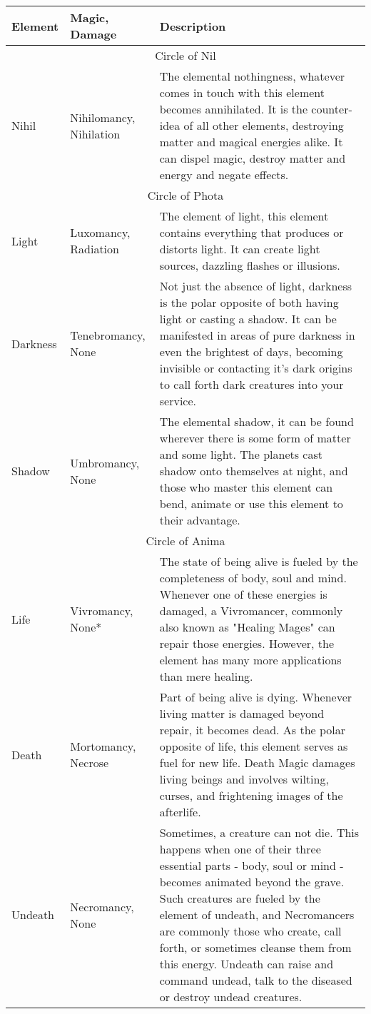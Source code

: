 \begin{longtable}{l | p{2.5cm} | p{7.25cm}}
	Element & Magic, Damage & Description\\ \hline
	\multicolumn{3}{c}{Circle of Nil}\\ \hline
	Nihil & Nihilomancy, Nihilation & 	The elemental nothingness, whatever comes in touch with this element becomes annihilated. It is the counter-idea of all other elements, destroying matter and magical energies alike. It can dispel magic, destroy matter and energy and negate effects.\\
	
	\multicolumn{3}{c}{Circle of Phota}\\ \hline
	Light & Luxomancy, Radiation & The element of light, this element contains everything that produces or distorts light. It can create light sources, dazzling flashes or illusions.\\
	Darkness & Tenebromancy, None & 	Not just the absence of light, darkness is the polar opposite of both having light or casting a shadow. It can be manifested in areas of pure darkness in even the brightest of days, becoming invisible or contacting it's dark origins to call forth dark creatures into your service.\\
	Shadow & Umbromancy, None & The elemental shadow, it can be found wherever there is some form of matter and some light. The planets cast shadow onto themselves at night,  and those who master this element can bend, animate or use this element to their advantage.\\
	
	\multicolumn{3}{c}{Circle of Anima} \\ \hline
	Life & Vivromancy, None* & 	The state of being alive is fueled by the completeness of body, soul and mind. Whenever one of these energies is damaged, a Vivromancer, commonly also known as "Healing Mages" can repair those energies. However, the element has many more applications than mere healing. \\
	Death & Mortomancy, Necrose & Part of being alive is dying. Whenever living matter is damaged beyond repair, it becomes dead. As the polar opposite of life, this element serves as fuel for new life. Death Magic damages living beings and involves wilting, curses, and frightening images of the afterlife.\\
	Undeath & Necromancy, None & 	Sometimes, a creature can not die. This happens when one of their three essential parts - body, soul or mind - becomes animated beyond the grave. Such creatures are fueled by the element of undeath, and Necromancers are commonly those who create, call forth, or sometimes cleanse them from this energy. Undeath can raise and command undead, talk to the diseased or destroy undead creatures. \\
	

\end{longtable}

